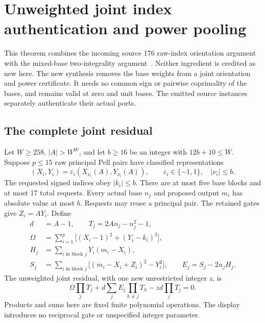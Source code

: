 \section{Unweighted joint index authentication and power pooling}
\label{sec:reciprocal23}
This theorem combines the incoming source 176 raw-index orientation argument
with the mixed-base two-integrality argument~\cite{joint176,mixed}. Neither ingredient is credited
as new here. The new synthesis removes the base weights from a joint
orientation and power certificate. It needs no common sign or pairwise
coprimality of the bases, and remains valid at zero and unit bases.
The emitted source instances separately authenticate their actual ports.

\subsection{The complete joint residual}
Let $W\ge258$, $|A|>W^W$, and let $b\ge16$ be an integer
with $12b+10\le W$.
Suppose $p\le15$ raw principal Pell pairs have classified representations
\[
 (X_i,Y_i)=\varepsilon_i(X_{\nu_i}(A),Y_{\nu_i}(A)),
 \qquad\varepsilon_i\in\{-1,1\},\quad |\nu_i|\le b.
\]
The requested signed indices obey $|k_i|\le b$. There are at most five
base blocks and at most 17 total requests. Every actual base $n_j$ and
proposed output $m_i$ has absolute value at most $b$. Requests may reuse a
principal pair. The retained gates give $Z_i=AY_i$. Define
\begin{align*}
 d&=A-1,\qquad T_j=2An_j-n_j^2-1,\\
 \Omega&=\sum_{i=1}^{p}\bigl[(X_i-1)^2+(Y_i-k_i)^2\bigr],\\
 H_j&=\sum_{i\text{ in block }j}Y_i(m_i-X_i),\\
 S_j&=\sum_{i\text{ in block }j}\bigl[(m_i-X_i+Z_i)^2-Y_i^2\bigr],
 \qquad E_j=S_j-2n_jH_j.
\end{align*}
The unweighted joint residual, with one new unrestricted integer $z$, is
\begin{equation}\label{eq:unweighted-joint}
 \Omega\prod_jT_j
 +d\sum_j E_j\prod_{h\ne j}T_h
 -zd\prod_jT_j=0.
\end{equation}
Products and sums here are fixed finite polynomial operations. The display
introduces no reciprocal gate or unspecified integer parameter.

